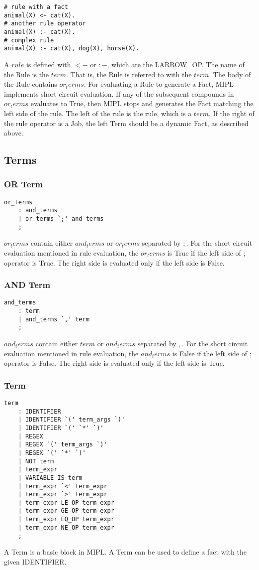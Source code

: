 \documentclass[prodmode,acmtecs]{acmsmall}
\begin{document}
\begin{lstlisting}
# rule with a fact
animal(X) <- cat(X).
# another rule operator
animal(X) :- cat(X).
# complex rule
animal(X) :- cat(X), dog(X), horse(X).
\end{lstlisting}

A $rule$ is defined with $<-$ or $:-$, which are the LARROW_OP. The name of the 
 Rule is the $term$. That is, the Rule is referred to with the $term$.
 The body of the Rule contains $or_terms$. For evaluating a Rule to generate a Fact,
 MIPL implements short circuit evaluation. If any of the subsequent compounds in
 $or_terms$ evaluates to True, then MIPL stops and generates the Fact matching the
 left side of the rule. The left of the rule is the rule, which is a $term$. 
 If the right of the rule operator is a Job,
 the left Term should be a dynamic Fact, as described above.
\medskip

\subsection{Terms}
\subsubsection{OR Term}
\begin{lstlisting}
or_terms
	: and_terms
	| or_terms `;' and_terms
	;
\end{lstlisting}
$or_terms$ contain either $and_terms$ or $or_terms$ separated by $;$. 
 For the short circuit evaluation mentioned in rule evaluation, the $or_terms$
 is True if the left side of $;$ operator is True. The right side is evaluated
 only if the left side is False.

\medskip

\subsubsection{AND Term}
\begin{lstlisting}
and_terms
	: term
	| and_terms `,' term	
	;
\end{lstlisting}
$and_terms$ contain either $term$ or $and_terms$ separated by $,$. 
 For the short circuit evaluation mentioned in rule evaluation, the $and_terms$
 is False if the left side of $;$ operator is False. The right side is evaluated
 only if the left side is True.
\medskip

\subsubsection{Term}
\begin{lstlisting}
term
	: IDENTIFIER		
	| IDENTIFIER `(' term_args `)'
	| IDENTIFIER `(' `*' `)'
	| REGEX			
	| REGEX `(' term_args `)'
	| REGEX `(' `*' `)'	
	| NOT term		
	| term_expr		
	| VARIABLE IS term	
	| term_expr `<' term_expr
	| term_expr `>' term_expr
	| term_expr LE_OP term_expr
	| term_expr GE_OP term_expr
	| term_expr EQ_OP term_expr
	| term_expr NE_OP term_expr
	;
\end{lstlisting}
A Term is a basic block in MIPL. A Term can be used to define a fact with the
given IDENTIFIER.
\medskip
\end{document}
